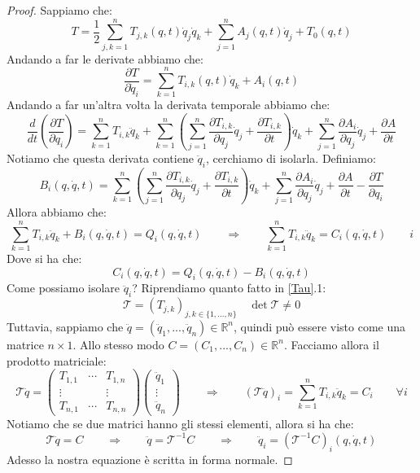 \documentclass[11pt,a4paper,twoside]{article}
\theoremstyle{definition}
\begin{document}
\begin{proof}
	Sappiamo che:
	\[ T = \frac 12 \sum_{j,k=1}^n T_{j,k}(q, t) \dot q_j \dot q_k + \sum_{j=1}^n A_j(q,t) \dot q_j + T_0(q,t) \]
	Andando a far le derivate abbiamo che:
	\[ \frac{\partial T}{\partial \dot q_i} = \sum_{k=1}^n T_{i,k}(q,t) \dot q_k + A_i(q,t) \]
	Andando a far un'altra volta la derivata temporale abbiamo che:
	\[ \frac{d}{dt}\left( \frac{\partial T}{\partial q_i} \right) = \sum_{k=1}^n T_{i,k} \ddot q_k + \sum_{k=1}^n \left( \sum_{j=1}^n \frac{\partial T_{i,k}}{\partial q_j}\dot q_j + \frac{\partial T_{i,k}}{\partial t} \right)\dot q_k + \sum_{j=1}^n \frac{\partial A_i}{\partial q_j} \dot q_j + \frac{\partial A}{\partial t} \]
	Notiamo che questa derivata contiene $\ddot q_i$, cerchiamo di isolarla.
	Definiamo:
	\[ B_i(q, \dot q, t) = \sum_{k=1}^n \left( \sum_{j=1}^n \frac{\partial T_{i,k}}{\partial q_j}\dot q_j + \frac{\partial T_{i,k}}{\partial t} \right)\dot q_k + \sum_{j=1}^n \frac{\partial A_i}{\partial q_j} \dot q_j + \frac{\partial A}{\partial t} - \frac{\partial T}{\partial q_i} \]
	Allora abbiamo che:
	\[ \sum_{k=1}^n T_{i,k} \ddot q_k + B_i(q, \dot q, t) = Q_i(q, \dot q, t)\qquad \Rightarrow \qquad \sum_{k=1}^n T_{i,k} \ddot q_k = C_i(q,\dot q, t)\qquad i\]
	Dove si ha che:
	\[ C_i(q,\dot q, t) = Q_i(q, \dot q, t) - B_i(q,\dot q, t) \]
	Come possiamo isolare $\ddot q_i$? Riprendiamo quanto fatto in \ref{Tau}.1:
	\[ \mathscr T = (T_{j,k})_{j,k \in \{1,...,n\}}\quad \det \mathscr T \neq 0 \]
	Tuttavia, sappiamo che $\ddot q = (\ddot q_1,...,\ddot q_n) \in \mathbb R^n$, quindi può essere visto come una matrice $n\times 1$. Allo stesso modo $C = (C_1,...,C_n) \in \mathbb R^n$. Facciamo allora il prodotto matriciale:
	\[ \mathscr T \ddot q = \begin{pmatrix}
		T_{1,1} & \cdots & T_{1,n}\\
		\vdots && \vdots\\
		T_{n,1} & \cdots & T_{n,n}
	\end{pmatrix} \begin{pmatrix}
		\ddot q_1\\ \vdots\\ \ddot q_n
	\end{pmatrix} \qquad \Rightarrow \qquad (\mathscr T \ddot q)_i = \sum_{k=1}^n T_{i,k} \ddot q_k = C_i \qquad \forall i\]
	Notiamo che se due matrici hanno gli stessi elementi, allora si ha che:
	\[ \mathscr T \ddot q = C \qquad \Rightarrow \qquad \ddot q = \mathscr T^{-1}C \qquad \Rightarrow \qquad \ddot q_i = (\mathscr T^{-1}C)_i (q,\dot q, t) \]
	Adesso la nostra equazione è scritta in forma normale.
\end{proof}
\end{document}
